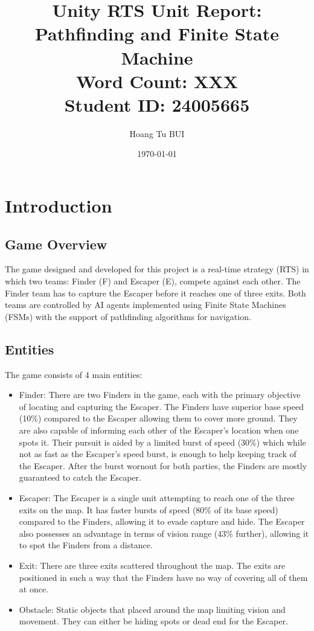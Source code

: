 \documentclass[a4paper,12pt]{article}
\title{Unity RTS Unit Report: Pathfinding and Finite State Machine
\\ \small Word Count: XXX 
\\ Student ID: 24005665}
\author{Hoang Tu BUI}
\date{\today}
\begin{document}
\maketitle
\tableofcontents
\newpage

\section{Introduction}


\subsection{Game Overview}
The game designed and developed for this project is a real-time strategy (RTS) in which two teams: Finder (F) and Escaper (E), compete against each other. 
The Finder team has to capture the Escaper before it reaches one of three exits.
Both teams are controlled by AI agents implemented using Finite State Machines (FSMs) with the support of pathfinding algorithms for navigation.


\subsection{Entities}
The game consists of 4 main entities:
\begin{itemize}
    \item Finder: 
    There are two Finders in the game, each with the primary objective of locating and capturing the Escaper.
    The Finders have superior base speed (10\%) compared to the Escaper allowing them to cover more ground.
    They are also capable of informing each other of the Escaper's location when one spots it.
    Their pursuit is aided by a limited burst of speed (30\%) which while not as fast as the Escaper's speed burst, is enough to help keeping track of the Escaper.
    After the burst wornout for both parties, the Finders are mostly guaranteed to catch the Escaper.
    
    \item Escaper: 
    The Escaper is a single unit attempting to reach one of the three exits on the map.
    It has faster bursts of speed (80\% of its base speed) compared to the Finders, allowing it to evade capture and hide.
    The Escaper also possesses an advantage in terms of vision range (43\% further), allowing it to spot the Finders from a distance.
    
    \item Exit: 
    There are three exits scattered throughout the map. 
    The exits are positioned in such a way that the Finders have no way of covering all of them at once.
    
    \item Obstacle: 
    Static objects that placed around the map limiting vision and movement. 
    They can either be hiding spots or dead end for the Escaper.
\end{itemize}
\end{document}

